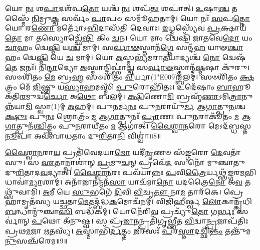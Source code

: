 𑌯𑍋 \ul{𑌨𑌃} 𑌶\-\ul{𑌪𑌾}\-𑌦𑌶᳴𑌪\-\ul{𑌤𑍋} 𑌯𑌶𑍍𑌚᳴ \ul{𑌨𑌃} 𑌶𑌪᳴\-\ul{𑌤𑌃} 𑌶𑌪𑌾॑𑌤𑍍। 
\-\ul{𑌉}\-𑌷𑌾\-\ul{𑌶𑍍𑌚} 𑌤𑌸𑍍𑌮𑍈᳴ \ul{𑌨𑌿}\-𑌮𑍍𑌰𑍁\-\ul{𑌕𑍍𑌚} 𑌸𑌰𑍍𑌵𑌂᳴ \ul{𑌪𑌾}\-𑌪𑍞 𑌸𑌮𑍂᳴𑌹𑌤𑌾𑌮𑍍। 
𑌯𑍋 𑌨𑌃᳴ \ul{𑌸}\-𑌪\-\ul{𑌤𑍍𑌨𑍋} 𑌯𑍋 𑌰\-\ul{𑌣𑍋} 𑌮𑌰𑍍𑌤𑍋᳴𑌽\-\ul{𑌭𑌿}\-𑌦𑌾𑌸᳴𑌤𑌿 𑌦𑍇𑌵𑌾𑌃। 
\-\ul{𑌇}\-𑌧𑍍𑌮𑌸𑍍𑌯𑍇᳴𑌵 \ul{𑌪𑍍𑌰}\-𑌕𑍍𑌷𑌾𑌯᳴\-\ul{𑌤𑍋} 𑌮𑌾 𑌤𑌸𑍍𑌯𑍋𑌚𑍍𑌛𑍇᳴\-\ul{𑌷𑌿} 𑌕𑌿𑌂 \ul{𑌚}\-𑌨। 
𑌯𑍋 𑌮𑌾𑌂 𑌦𑍍𑌵𑍇𑌷𑍍𑌟𑌿᳴ 𑌜𑌾𑌤𑌵𑍇\-\ul{𑌦𑍋} 𑌯𑌂 \ul{𑌚𑌾}\-𑌹𑌂 𑌦𑍍𑌵𑍇\-\ul{𑌷𑍍𑌮𑌿} 𑌯\-\ul{𑌶𑍍𑌚} 𑌮𑌾𑌮𑍍। 
𑌸\-\ul{𑌰𑍍𑌵𑌾}\-\-\ul{𑍟}\-𑌸𑍍𑌤𑌾𑌨᳴\-\ul{𑌗𑍍𑌨𑍇} 𑌸𑌨𑍍𑌦᳴\-\ul{𑌹} 𑌯𑌾𑍟\-\ul{𑌶𑍍𑌚𑌾}\-𑌹𑌂 𑌦𑍍𑌵𑍇\-\ul{𑌷𑍍𑌮𑌿} 𑌯𑍇 \ul{𑌚} 𑌮𑌾𑌮𑍍। 
𑌯𑍋 \ul{𑌅}\-𑌸𑍍𑌮𑌭𑍍𑌯᳴𑌮𑌰𑌾\-\ul{𑌤𑍀}\-𑌯𑌾𑌦𑍍𑌯𑌶𑍍𑌚᳴ \ul{𑌨𑍋} 𑌦𑍍𑌵𑍇𑌷᳴\-\ul{𑌤𑍇} 𑌜𑌨𑌃᳴। 
𑌨𑌿\-\ul{𑌨𑍍𑌦𑌾}\-𑌦𑍍𑌯𑍋 \ul{𑌅}\-𑌸𑍍𑌮𑌾𑌨𑍍𑌦𑌿𑌫𑍍𑌸𑌾॑\-\ul{𑌚𑍍𑌚} 𑌸\-\ul{𑌰𑍍𑌵𑌾}\-\-\ul{𑍟}\-𑌸𑍍𑌤𑌾𑌨𑍍𑌮᳴\-\ul{𑌷𑍍𑌮}\-𑌷𑌾 𑌕𑍁᳴𑌰𑍁। 
𑌸𑍞𑌶𑌿᳴𑌤𑌂 \ul{𑌮𑍇} 𑌬𑍍𑌰\-\ul{𑌹𑍍𑌮} 𑌸𑍞𑌶𑌿᳴𑌤𑌂 \ul{𑌵𑍀}\-𑌰𑍍𑌯𑌾(1\char"E009)𑌮𑍍𑌬𑌲𑌮𑍍॑। 
𑌸𑍞𑌶𑌿᳴𑌤𑌂 \ul{𑌕𑍍𑌷}\-𑌤𑍍𑌰𑌂 𑌮𑍇᳴ \ul{𑌜𑌿}\-𑌷𑍍𑌣𑍁 𑌯\-\ul{𑌸𑍍𑌯𑌾}\-𑌹𑌮𑌸𑍍𑌮𑌿᳴ \ul{𑌪𑍁}\-𑌰𑍋𑌹𑌿᳴𑌤𑌃। 
𑌉𑌦𑍇᳴𑌷𑌾𑌂 \ul{𑌬𑌾}\-𑌹𑍂 𑌅᳴𑌤𑌿\-\ul{𑌰}\-𑌮𑍁𑌦𑍍𑌵\-\ul{𑌰𑍍𑌚𑍋} 𑌅\-\ul{𑌥𑍋} 𑌬𑌲𑌮𑍍॑। 
\-\ul{𑌕𑍍𑌷𑌿}\-𑌣𑍋\-\ul{𑌮𑌿} 𑌬𑍍𑌰𑌹𑍍𑌮᳴\-\ul{𑌣𑌾}\-𑌽𑌮𑌿\-\ul{𑌤𑍍𑌰𑌾}\-𑌨𑍁𑌨𑍍𑌨᳴𑌯𑌾\-\ul{𑌮𑌿} 𑌸𑍍𑌵𑌾(1)𑌮𑍍 \ul{𑌅}\-𑌹𑌮𑍍। 
𑌪𑍁\-\ul{𑌨}\-𑌰𑍍𑌮\-\ul{𑌨𑌃} 𑌪𑍁\-\ul{𑌨}\-𑌰𑌾𑌯𑍁᳴\-\ul{𑌰𑍍𑌮} 𑌆\-\ul{𑌗𑌾}\-𑌤𑍍𑌪𑍁\-\ul{𑌨}\-𑌶𑍍𑌚\-\ul{𑌕𑍍𑌷𑍁𑌃} 𑌪𑍁\-\ul{𑌨𑌃} 𑌶𑍍𑌰𑍋𑌤𑍍𑌰𑌂᳴ \ul{𑌮} 𑌆\-\ul{𑌗𑌾}\-𑌤𑍍𑌪𑍁𑌨𑌃᳴ \ul{𑌪𑍍𑌰𑌾}\-𑌣𑌃 𑌪𑍁\-\ul{𑌨}\-𑌰𑌾𑌕𑍂᳴𑌤𑌂 \ul{𑌮} 𑌆\-\ul{𑌗𑌾}\-𑌤𑍍𑌪𑍁𑌨᳴\-\ul{𑌶𑍍𑌚𑌿}\-𑌤𑍍𑌤𑌂 𑌪𑍁\-\ul{𑌨}\-𑌰𑌾𑌧𑍀᳴𑌤𑌂 \ul{𑌮} 𑌆𑌗𑌾॑𑌤𑍍। 
\-\ul{𑌵𑍈}\-\-\ul{𑌶𑍍𑌵𑌾}\-\-\ul{𑌨}\-𑌰𑍋 𑌮𑍇𑌽𑌦᳴𑌬𑍍𑌧𑌸𑍍𑌤\-\ul{𑌨𑍂}\-𑌪𑌾 𑌅𑌵᳴𑌬𑌾𑌧𑌤𑌾𑌂 𑌦𑍁\-\ul{𑌰𑌿}\-𑌤𑌾\-\ul{𑌨𑌿} 𑌵𑌿𑌶𑍍𑌵𑌾॑॥8॥\anuvakamend

\-\ul{𑌵𑍈}\-\-\ul{𑌶𑍍𑌵𑌾}\-\-\ul{𑌨}\-𑌰𑌾\-\ul{𑌯} 𑌪𑍍𑌰𑌤𑌿᳴𑌵𑍇𑌦𑌯𑌾\-\ul{𑌮𑍋} 𑌯𑌦𑍀᳴\-\ul{𑌨𑍃}\-𑌣𑍞 𑌸᳴\-\ul{𑌙𑍍𑌗}\-𑌰𑍋 \ul{𑌦𑍇}\-𑌵𑌤𑌾᳴𑌸𑍁। 
𑌸 \ul{𑌏}\-𑌤𑌾𑌨𑍍𑌪𑌾𑌶𑌾॑𑌨𑍍 \ul{𑌪𑍍𑌰}\-𑌮𑍁\-\ul{𑌚}\-𑌨𑍍 𑌪𑍍𑌰𑌵𑍇᳴\-\ul{𑌦} 𑌸 𑌨𑍋᳴ 𑌮𑍁𑌞𑍍𑌚𑌾𑌤𑍁 𑌦𑍁\-\ul{𑌰𑌿}\-𑌤𑌾𑌦\-\ul{𑌵}\-𑌦𑍍𑌯𑌾𑌤𑍍। 
\-\ul{𑌵𑍈}\-\-\ul{𑌶𑍍𑌵𑌾}\-\-\ul{𑌨}\-𑌰𑌃 𑌪𑌵᳴𑌯𑌾𑌨𑍍𑌨𑌃 \ul{𑌪}\-𑌵𑌿\-\ul{𑌤𑍍𑌰𑍈}\-𑌰𑍍𑌯𑌥𑍍𑌸᳴\-\ul{𑌙𑍍𑌗}\-𑌰\-\ul{𑌮}\-𑌭𑌿𑌧𑌾𑌵𑌾॑\-\ul{𑌮𑍍𑌯𑌾}\-𑌶𑌾𑌮𑍍। 
𑌅𑌨𑌾᳴𑌜𑌾\-\ul{𑌨}\-𑌨𑍍𑌮𑌨᳴\-\ul{𑌸𑌾} 𑌯𑌾𑌚᳴𑌮𑌾\-\ul{𑌨𑍋} 𑌯𑌦𑌤𑍍𑌰𑍈\-\ul{𑌨𑍋} 𑌅\-\ul{𑌵} 𑌤𑌥𑍍𑌸𑍁᳴𑌵𑌾𑌮𑌿। 
\-\ul{𑌅}\-𑌮𑍀 𑌯𑍇 \ul{𑌸𑍁}\-𑌭𑌗𑍇᳴ \ul{𑌦𑌿}\-𑌵𑌿 \ul{𑌵𑌿}\-𑌚𑍃\-\ul{𑌤𑍗} 𑌨𑌾\-\ul{𑌮} 𑌤𑌾𑌰᳴𑌕𑍇। 
𑌪𑍍𑌰𑍇𑌹𑌾𑌮𑍃𑌤᳴𑌸𑍍𑌯 𑌯𑌚𑍍𑌛𑌤𑌾\-\ul{𑌮𑍇}\-𑌤𑌦𑍍𑌬᳴𑌦𑍍𑌧\-\ul{𑌕}\-𑌮𑍋𑌚᳴𑌨𑌮𑍍। 
𑌵𑌿𑌜𑌿᳴𑌹𑍀𑌰𑍍𑌷𑍍𑌵 \ul{𑌲𑍋}\-𑌕𑌾𑌨𑍍𑌕𑍃᳴𑌧𑌿 \ul{𑌬}\-𑌨𑍍𑌧𑌾𑌨𑍍𑌮𑍁᳴𑌞𑍍𑌚𑌾\-\ul{𑌸𑌿} 𑌬𑌦𑍍𑌧᳴𑌕𑌮𑍍। 
𑌯𑍋𑌨𑍇᳴𑌰𑌿\-\ul{𑌵} 𑌪𑍍𑌰𑌚𑍍𑌯𑍁᳴\-\ul{𑌤𑍋} 𑌗\-\ul{𑌰𑍍𑌭𑌃} 𑌸𑌰𑍍𑌵𑌾॑𑌨𑍍 \ul{𑌪}\-𑌥𑍋 𑌅᳴𑌨𑍁𑌷𑍍𑌵। 
𑌸 𑌪𑍍𑌰᳴\-\ul{𑌜𑌾}\-𑌨𑌨𑍍𑌪𑍍𑌰𑌤𑌿᳴𑌗𑍃𑌭𑍍𑌣𑍀𑌤 \ul{𑌵𑌿}\-𑌦𑍍𑌵𑌾\-\ul{𑌨𑍍𑌪𑍍𑌰}\-𑌜𑌾𑌪᳴𑌤𑌿𑌃 𑌪𑍍𑌰𑌥\-\ul{𑌮}\-𑌜𑌾 \ul{𑌋}\-𑌤𑌸𑍍𑌯᳴। 
\-\ul{𑌅}\-𑌸𑍍𑌮𑌾𑌭𑌿᳴\-\ul{𑌰𑍍𑌦}\-𑌤𑍍𑌤𑌂 \ul{𑌜}\-𑌰𑌸𑌃᳴ \ul{𑌪}\-𑌰\-\ul{𑌸𑍍𑌤𑌾}\-𑌦𑌚𑍍𑌛𑌿᳴\-\ul{𑌨𑍍𑌨𑌂} 𑌤𑌨𑍍𑌤𑍁᳴𑌮\-\ul{𑌨𑍁}\-𑌸𑌞𑍍𑌚᳴𑌰𑍇𑌮॥9॥

